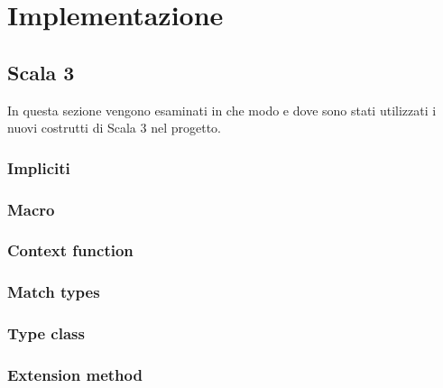 \chapter{Implementazione}\label{ch:implementazione}
\section{Scala 3}\label{sec:scala-3}
In questa sezione vengono esaminati in che modo e dove sono stati utilizzati i nuovi costrutti di Scala 3 nel progetto.

\subsection{Impliciti}\label{subsec:impliciti}

\subsection{Macro}\label{subsec:macro}

\subsection{Context function}\label{subsec:context-function}

\subsection{Match types}\label{subsec:match-types}

\subsection{Type class}\label{subsec:type-class}

\subsection{Extension method}\label{subsec:extension-method}

